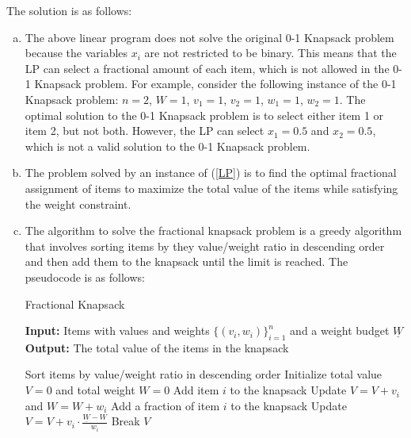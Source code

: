 \documentclass[10pt]{article}
\begin{document}
\begin{solution}
The solution is as follows:
    \begin{enumerate}[(a)]
        \item The above linear program does not solve the original 0-1 Knapsack problem because the variables $x_i$ are not restricted to be binary. This means that the LP can select a fractional amount of each item, which is not allowed in the 0-1 Knapsack problem. For example, consider the following instance of the 0-1 Knapsack problem: $n=2$, $W=1$, $v_1=1$, $v_2=1$, $w_1=1$, $w_2=1$. The optimal solution to the 0-1 Knapsack problem is to select either item 1 or item 2, but not both. However, the LP can select $x_1 = 0.5$ and $x_2 = 0.5$, which is not a valid solution to the 0-1 Knapsack problem.
        \item The problem solved by an instance of (\ref{LP}) is to find the optimal fractional assignment of items to maximize the total value of the items while satisfying the weight constraint.
        \item The algorithm to solve the fractional knapsack problem is a greedy algorithm that involves sorting items by they value/weight ratio in descending order and then add them to the knapsack until the limit is reached. The pseudocode is as follows:
            \begin{algorithm}
                \caption{Fractional Knapsack}
                \textbf{Input:} Items with values and weights $\{(v_i,w_i)\}_{i=1}^n$ and a weight budget $\underline{W}$\\
                \textbf{Output:} The total value of the items in the knapsack
                \begin{algorithmic}[1]
                    \State Sort items by value/weight ratio in descending order
                    \State Initialize total value $V = 0$ and total weight $W = 0$
                            \State Add item $i$ to the knapsack
                            \State Update $V = V + v_i$ and $W = W + w_i$
                        \Else
                            \State Add a fraction of item $i$ to the knapsack
                            \State Update $V = V + v_i \cdot \frac{\underline{W} - W}{w_i}$
                            \State Break
                        \EndIf
                    \EndFor
                    \State \Return $V$
                \end{algorithmic}
            \end{algorithm}

\end{enumerate}
\end{solution}
\end{document}
